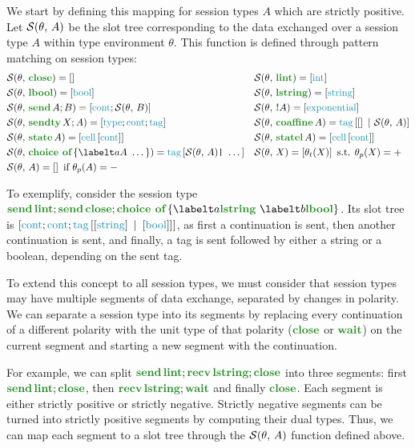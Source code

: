 We start by defining this mapping for session types $A$ which are strictly positive. Let $\mathcal{S}(\theta,\,A)$ be the slot tree corresponding to the data exchanged over a session type $A$ within type environment $\theta$. This function is defined through pattern matching on session types:
\[\begin{aligned}
        &\slots{\theta}{\closet} = \nilst && \slots{\theta}{\lintt} = \seqst{\ints} \\
        &\slots{\theta}{\lboolt} = \seqst{\bools} && \slots{\theta}{\lstringt} = \seqst{\strings} \\
        &\slots{\theta}{\sendt{A}{B}} = \seqst{\conts; \slots{\theta}{B}} && \slots{\theta}{\bangt{A}} = \seqst{\exponentials} \\
        &\slots{\theta}{\sendtyt{X}{A}} = \seqst{\types; \conts; \tags} && \slots{\theta}{\coaffinet A} = \tagst{\nilst\tagsepst\slots{\theta}{A}} \\
        &\slots{\theta}{\statet A} = \seqst{\cells{\conts}} && \slots{\theta}{\statelt A} = \seqst{\cells{\conts}} \\
        &\slots{\theta}{\choicet{\labelt a A\ \dots}} = \tagst{\slots{\theta}{A} \texttt{|}\ \dots} && \slots{\theta}{X} = \seqst{\typeidof{\theta}{X}} \text { s.t. } \polarityof{\theta}{X} = + \\
        &\slots{\theta}{A} = \nilst \text{ if } \polarityof{\theta}{A} = -
\end{aligned}\]

To exemplify, consider the session type $\sendt{\lintt}{\sendt{\closet}{\choicet{\labelt a \lstringt\ \labelt b \lboolt}}}$. Its slot tree is $\seqst{\conts; \conts; \tagst{\seqst{\strings}\tagsepst \seqst{\bools}}}$, as first a continuation is sent, then another continuation is sent, and finally, a tag is sent followed by either a string or a boolean, depending on the sent tag.

To extend this concept to all session types, we must consider that session types may have multiple segments of data exchange, separated by changes in polarity. We can separate a session type into its segments by replacing every continuation of a different polarity with the unit type of that polarity ($\closet$ or $\waitt$) on the current segment and starting a new segment with the continuation.

For example, we can split $\sendt{\lintt}{\recvt{\lstringt}{\closet}}$ into three segments: first $\sendt{\lintt}{\closet}$, then $\recvt{\lstringt}{\waitt}$ and finally  $\closet$. Each segment is either strictly positive or strictly negative. Strictly negative segments can be turned into strictly positive segments by computing their dual types. Thus, we can map each segment to a slot tree through the $\mathcal{S}(\theta,\,A)$ function defined above.

